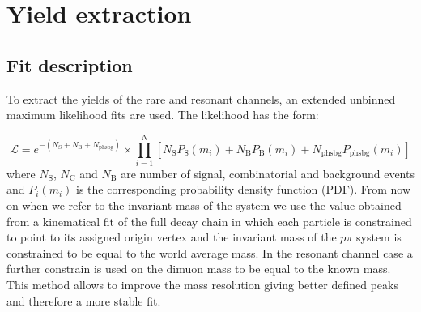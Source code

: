 \chapter{Yield extraction}

\section{Fit description}
\label{sec:Lb_fit}

To extract the yields of the rare and resonant channels, an extended unbinned maximum likelihood fits are used.
The likelihood has the form:

\begin{equation}
\mathcal{L}=e^{-(N_\mathrm{S}+N_\mathrm{B}+N_{\mathrm{phsbg}})}\times\prod_{i=1}^{N}\left[
N_\mathrm{S}P_{\mathrm{S}}(m_i)+N_\mathrm{B}P_\mathrm{B}(m_i)+N_{\mathrm{phsbg}}P_{\mathrm{phsbg}}(m_i)\right]
\end{equation}
\noindent
where $N_\mathrm{S}$, $N_\mathrm{C}$ and $N_\mathrm{B}$ are number of signal, combinatorial and
\KS background events and $P_i(m_i)$ is the corresponding probability density function (PDF).
From now on when we refer to the invariant mass of the \Lb system we use the value obtained from
a kinematical fit of the full decay chain in which each particle is constrained to point to its
assigned origin vertex and the invariant mass of the $p\pi$ system is constrained to be equal to
the world average \Lz mass. In the resonant channel case a further constrain is used on the dimuon
mass to be equal to the known \jpsi mass. This method allows to improve the mass resolution giving
better defined peaks and therefore a more stable fit.

